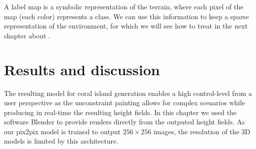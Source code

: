 

A label map is a symbolic representation of the terrain, where each pixel of the map (each color) represents a class. We can use this information to keep a sparse representation of the environment, for which we will see how to treat in the next chapter about .


\section{Results and discussion}
\label{sec:coral-island_results}

The resulting model for coral island generation enables a high control-level from a user perspective as the unconstraint painting allows for complex scenarios while producing in real-time the resulting height fields. In this chapter we used the software Blender to provide renders directly from the outputed height fields. As our pix2pix model is trained to output $256\times256$ images, the resolution of the 3D models is limited by this architecture.


